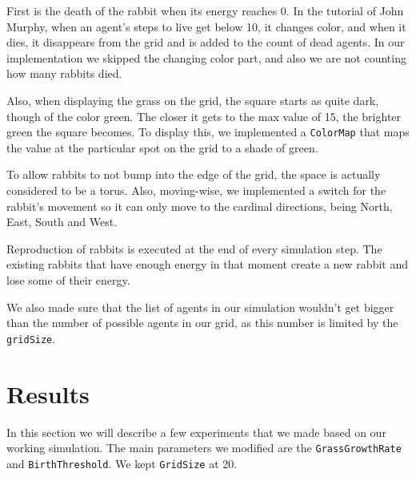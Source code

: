 \documentclass[11pt]{article}
\begin{document}
First is the death of the rabbit when its energy reaches 0. In the tutorial of John Murphy, when an agent's steps to live get below 10, it changes color, and when it dies, it disappears from the grid and is added to the count of dead agents. In our implementation we skipped the changing color part, and also we are not counting how many rabbits died.

Also, when displaying the grass on the grid, the square starts as quite dark, though of the color green. The closer it gets to the max value of 15, the brighter green the square becomes. To display this, we implemented a \texttt{ColorMap} that maps the value at the particular spot on the grid to a shade of green.

To allow rabbits to not bump into the edge of the grid, the space is actually considered to be a torus.
Also, moving-wise, we implemented a switch for the rabbit's movement so it can only move to the cardinal directions, being North, East, South and West.

Reproduction of rabbits is executed at the end of every simulation step. The existing rabbits that have enough energy in that moment create a new rabbit and lose some of their energy.

We also made sure that the list of agents in our simulation wouldn't get bigger than the number of possible agents in our grid, as this number is limited by the \texttt{gridSize}.

\section{Results}
In this section we will describe a few experiments that we made based on our working simulation. The main parameters we modified are the \texttt{GrassGrowthRate} and \texttt{BirthThreshold}.
We kept \texttt{GridSize} at 20.
\end{document}
